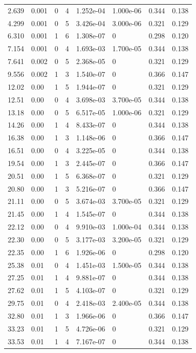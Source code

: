 \documentclass[preview]{standalone}
\begin{document}
{{\begin{tabular}{L{1.2cm}C{1.2cm} C{0.3cm}C{0.5cm} C{1.4cm}C{1.4cm} C{1.4cm}C{1.4cm}}
  2.639  &  0.001  & 0     &  4 &  1.252e-04  & 1.000e-06  & 0.344 &  0.138   \\ 
  4.299  &  0.001  & 0     &  5 &  3.426e-04  & 3.000e-06  & 0.321 &  0.129   \\ 
  6.310  &  0.001  & 1     &  6 &  1.308e-07  & 0  & 0.298 &  0.120   \\ 
  7.154  &  0.001  & 0     &  4 &  1.693e-03  & 1.700e-05  & 0.344 &  0.138   \\ 
  7.641  &  0.002  & 0     &  5 &  2.368e-05  & 0  & 0.321 &  0.129   \\ 
  9.556  &  0.002  & 1     &  3 &  1.540e-07  & 0  & 0.366 &  0.147   \\ 
  12.02  &  0.00  & 1     &  5 &  1.944e-07  & 0  & 0.321 &  0.129   \\ 
  12.51  &  0.00  & 0     &  4 &  3.698e-03  & 3.700e-05  & 0.344 &  0.138   \\ 
  13.18  &  0.00  & 0     &  5 &  6.517e-05  & 1.000e-06  & 0.321 &  0.129   \\ 
  14.26  &  0.00  & 1     &  4 &  8.433e-07  & 0  & 0.344 &  0.138   \\ 
  16.38  &  0.00  & 1     &  3 &  1.148e-06  & 0  & 0.366 &  0.147   \\ 
  16.51  &  0.00  & 0     &  4 &  3.225e-05  & 0  & 0.344 &  0.138   \\ 
  19.54  &  0.00  & 1     &  3 &  2.445e-07  & 0  & 0.366 &  0.147   \\ 
  20.51  &  0.00  & 1     &  5 &  6.368e-07  & 0  & 0.321 &  0.129   \\ 
  20.80  &  0.00  & 1     &  3 &  5.216e-07  & 0  & 0.366 &  0.147   \\ 
  21.11  &  0.00  & 0     &  5 &  3.674e-03  & 3.700e-05  & 0.321 &  0.129   \\ 
  21.45  &  0.00  & 1     &  4 &  1.545e-07  & 0  & 0.344 &  0.138   \\ 
  22.12  &  0.00  & 0     &  4 &  9.910e-03  & 1.000e-04  & 0.344 &  0.138   \\ 
  22.30  &  0.00  & 0     &  5 &  3.177e-03  & 3.200e-05  & 0.321 &  0.129   \\ 
  22.35  &  0.00  & 1     &  6 &  1.926e-06  & 0  & 0.298 &  0.120   \\ 
  25.38  &  0.01  & 0     &  4 &  1.451e-03  & 1.500e-05  & 0.344 &  0.138   \\ 
  27.25  &  0.01  & 1     &  4 &  9.881e-07  & 0  & 0.344 &  0.138   \\ 
  27.62  &  0.01  & 1     &  5 &  4.103e-07  & 0  & 0.321 &  0.129   \\ 
  29.75  &  0.01  & 0     &  4 &  2.418e-03  & 2.400e-05  & 0.344 &  0.138   \\ 
  32.80  &  0.01  & 1     &  3 &  1.966e-06  & 0  & 0.366 &  0.147   \\ 
  33.23  &  0.01  & 1     &  5 &  4.726e-06  & 0  & 0.321 &  0.129   \\ 
  33.53  &  0.01  & 1     &  4 &  7.167e-07  & 0  & 0.344 &  0.138   \\ 
\hline 
\end{tabular} 

}}
\end{document}
